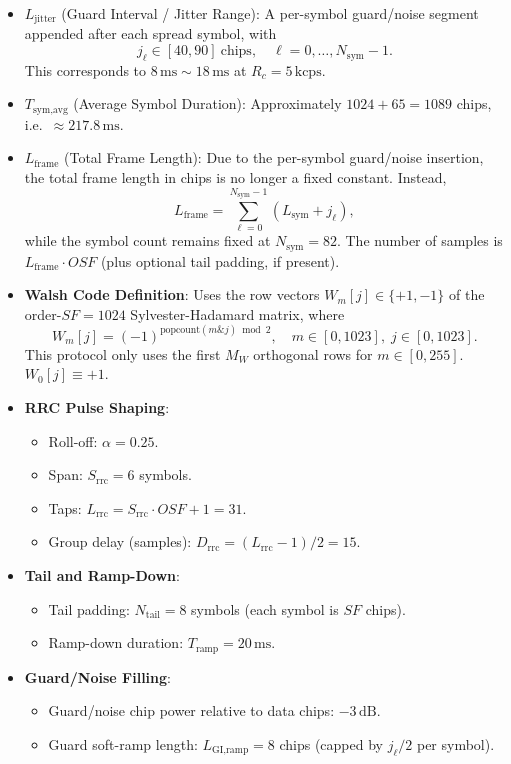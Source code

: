 \documentclass[11pt]{article}
\begin{document}
\begin{itemize}
\item $L_{\text{jitter}}$ (Guard Interval / Jitter Range): A per-symbol guard/noise segment appended after each spread symbol, with
  \[
    j_\ell \in [40,90]\ \text{chips},\quad \ell=0,\dots,N_{\text{sym}}-1.
  \]
  This corresponds to $8\,\text{ms}\sim 18\,\text{ms}$ at $R_c=5\,\text{kcps}$.
\item $T_{\text{sym,avg}}$ (Average Symbol Duration): Approximately $1024+65=1089$ chips, i.e.\ $\approx 217.8\,\text{ms}$.
\item $L_{\text{frame}}$ (Total Frame Length): Due to the per-symbol guard/noise insertion, the total frame length in chips is no longer a fixed constant. Instead,
  \[
    L_{\text{frame}}=\sum_{\ell=0}^{N_{\text{sym}}-1} (L_{\text{sym}} + j_\ell),
  \]
  while the symbol count remains fixed at $N_{\text{sym}}=82$. The number of samples is $L_{\text{frame}}\cdot \mathit{OSF}$ (plus optional tail padding, if present).
\item \textbf{Walsh Code Definition}: Uses the row vectors $W_m[j]\in\{+1,-1\}$ of the order-$\mathit{SF}=1024$ Sylvester-Hadamard matrix, where
  \[
    W_m[j]=(-1)^{\mathrm{popcount}(m \mathbin{\&} j)\bmod 2},\quad m\in[0,1023],\; j\in[0,1023].
  \]
  This protocol only uses the first $M_W$ orthogonal rows for $m\in[0,255]$. $W_0[j]\equiv +1$.
\item \textbf{RRC Pulse Shaping}:
  \begin{itemize}
  \item Roll-off: $\alpha=0.25$.
  \item Span: $S_{\text{rrc}}=6$ symbols.
  \item Taps: $L_{\text{rrc}} = S_{\text{rrc}}\cdot \mathit{OSF}+1 = 31$.
  \item Group delay (samples): $D_{\text{rrc}}=(L_{\text{rrc}}-1)/2=15$.
  \end{itemize}
\item \textbf{Tail and Ramp-Down}:
  \begin{itemize}
  \item Tail padding: $N_{\text{tail}}=8$ symbols (each symbol is $\mathit{SF}$ chips).
  \item Ramp-down duration: $T_{\text{ramp}}=20\,\text{ms}$.
  \end{itemize}
\item \textbf{Guard/Noise Filling}:
  \begin{itemize}
  \item Guard/noise chip power relative to data chips: $-3\,\text{dB}$.
  \item Guard soft-ramp length: $L_{\text{GI,ramp}}=8$ chips (capped by $j_\ell/2$ per symbol).

\end{itemize}
\end{itemize}
\end{document}
